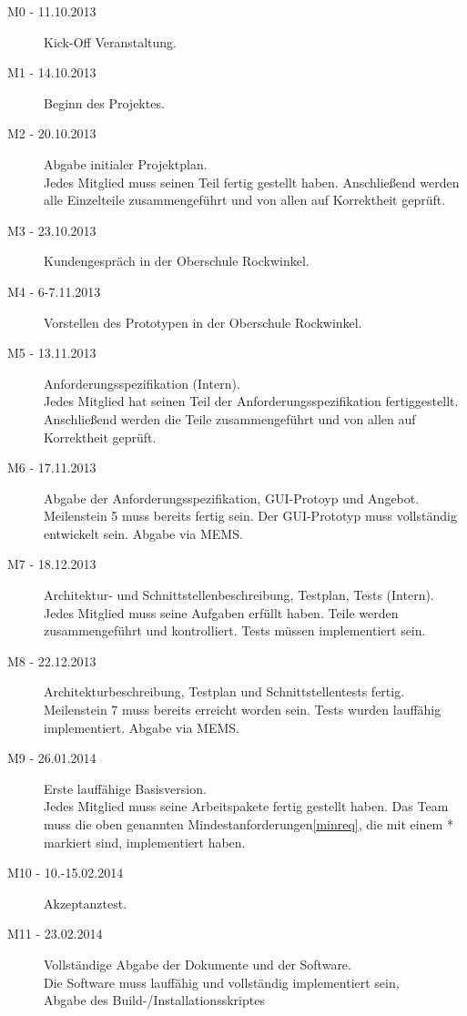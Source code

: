 \documentclass[fontsize=12pt,paper=a4,twoside]{scrartcl}
\begin{document}
\begin{description}
\item[M0 - 11.10.2013] Kick-Off Veranstaltung.

\item[M1 - 14.10.2013] Beginn des Projektes.

\item[M2 - 20.10.2013] Abgabe initialer Projektplan.\\
Jedes Mitglied muss seinen Teil fertig gestellt haben. Anschließend werden alle Einzelteile zusammengeführt und von allen auf Korrektheit geprüft.

\item[M3 - 23.10.2013] Kundengespräch in der Oberschule Rockwinkel.

\item[M4 - 6-7.11.2013] Vorstellen des Prototypen in der Oberschule Rockwinkel.

\item[M5 - 13.11.2013] Anforderungsspezifikation (Intern). \\
Jedes Mitglied hat seinen Teil der Anforderungsspezifikation fertiggestellt. Anschließend werden die Teile zusammengeführt und von allen auf Korrektheit geprüft.

\item[M6 - 17.11.2013] Abgabe der Anforderungsspezifikation, GUI-Protoyp und Angebot. \\
Meilenstein 5 muss bereits fertig sein. Der GUI-Prototyp muss vollständig entwickelt sein. Abgabe via MEMS.

\item[M7 - 18.12.2013] Architektur- und Schnittstellenbeschreibung, Testplan, Tests (Intern).\\
Jedes Mitglied muss seine Aufgaben erfüllt haben. Teile werden zusammengeführt und kontrolliert. Tests müssen implementiert sein.

\item[M8 - 22.12.2013] Architekturbeschreibung, Testplan und Schnittstellentests fertig.\\
Meilenstein 7 muss bereits erreicht worden sein. Tests wurden lauffähig implementiert. Abgabe via MEMS.

\item[M9 - 26.01.2014] Erste lauffähige Basisversion.\\
Jedes Mitglied muss seine Arbeitspakete fertig gestellt haben. Das Team muss die oben genannten Mindestanforderungen\ref{minreq}, die mit einem * markiert sind, implementiert haben.

\item[M10 - 10.-15.02.2014] Akzeptanztest.

\item[M11 - 23.02.2014] Vollständige Abgabe der Dokumente und der Software. \\
Die Software muss lauffähig und vollständig implementiert sein,\\
Abgabe des Build-/Installationsskriptes
\end{description}
\end{document}
